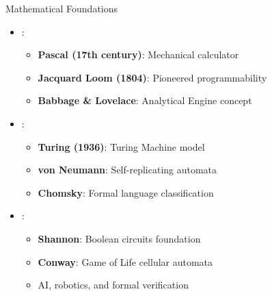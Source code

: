 \begin{frame}{Mathematical Foundations}
\begin{itemize}
\item {}:
\begin{itemize}
\item \textbf{Pascal (17th century)}: Mechanical calculator
\item \textbf{Jacquard Loom (1804)}: Pioneered programmability
\item \textbf{Babbage \& Lovelace}: Analytical Engine concept
\end{itemize}
\vspace{0.5cm}
\item {}:
\begin{itemize}
\item \textbf{Turing (1936)}: Turing Machine model
\item \textbf{von Neumann}: Self-replicating automata
\item \textbf{Chomsky}: Formal language classification
\end{itemize}
\vspace{0.3cm}
\item {}:
\begin{itemize}
\item \textbf{Shannon}: Boolean circuits foundation
\item \textbf{Conway}: Game of Life cellular automata
\item AI, robotics, and formal verification
\end{itemize}
\end{itemize}
\end{frame}

